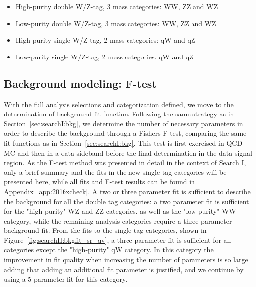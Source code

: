 \begin{itemize}
\item High-purity double W/Z-tag, 3 mass categories: WW, ZZ and WZ
\item Low-purity double W/Z-tag, 3 mass categories: WW, ZZ and WZ
\item High-purity single W/Z-tag, 2 mass categories: qW and qZ
\item Low-purity single W/Z-tag, 2 mass categories: qW and qZ
\end{itemize}

\subsection{Background modeling: F-test} 
\label{sec:searchII:ftest}
With the full analysis selections and categorization defined, we move to the determination of background fit function. Following the same strategy as in Section~\ref{sec:searchI:bkg}, we determine the number of necessary parameters in order to describe the background through a Fishers F-test, comparing the same fit functions as in Section~\ref{sec:searchI:bkg}. This test is first exercised in QCD MC and then in a data sideband before the final determination in the data signal region. As the F-test method was presented in detail in the context of Search I, only a brief summary and the fits in the new single-tag categories will be presented here, while all fits and F-test results can be found in Appendix~\ref{app:2016xcheck}.\newline
A two or three parameter fit is sufficient to describe the background for all the double tag categories: a two parameter fit is sufficient for the "high-purity" WZ and ZZ categories. 
as well as the "low-purity" WW category, while the remaining analysis categories require a three parameter background fit.
From the fits to the single tag categories, shown in Figure~\ref{fig:searchII:bkgfit_sr_qv}, a three parameter fit is sufficient for all categories except the "high-purity" qW category. In this category the improvement in fit quality when increasing the number
of parameters is so large adding that adding an additional fit parameter is justified, and we continue by using a 5 parameter fit for this category. 
